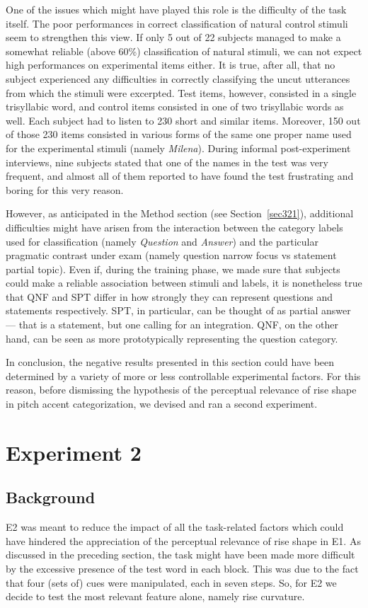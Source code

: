 One of the issues which might have played this role is the difficulty of the task itself. The poor performances in correct classification of natural control stimuli seem to strengthen this view. If only 5 out of 22 subjects managed to make a somewhat reliable (above 60\%) classification of natural stimuli, we can not expect high performances on experimental items either. It is true, after all, that no subject experienced any difficulties in correctly classifying the uncut utterances from which the stimuli were excerpted. Test items, however, consisted in a single trisyllabic word, and control items consisted in one of two trisyllabic words as well. Each subject had to listen to 230 short and similar items. Moreover, 150 out of those 230 items consisted in various forms of the same one proper name used for the experimental stimuli (namely \textit{Milena}). During informal post-experiment interviews, nine subjects stated that one of the names in the test was very frequent, and almost all of them reported to have found the test frustrating and boring for this very reason.

However, as anticipated in the Method section (see Section~\ref{sec321}), additional difficulties might have arisen from the interaction between the category labels used for classification (namely \textit{Question} and \textit{Answer}) and the particular pragmatic contrast under exam (namely question narrow focus vs statement partial topic). Even if, during the training phase, we made sure that subjects could make a reliable association between stimuli and labels, it is nonetheless true that QNF and SPT differ in how strongly they can represent questions and statements respectively. SPT, in particular, can be thought of as partial answer --- that is a statement, but one calling for an integration. QNF, on the other hand, can be seen as more prototypically representing the question category.

In conclusion, the negative results presented in this section could have been determined by a variety of more or less controllable experimental factors. For this reason, before dismissing the hypothesis of the perceptual relevance of rise shape in pitch accent categorization, we devised and ran a second experiment.

\section{Experiment 2}\label{sec33}
\subsection{Background}\label{sec3300}
E2 was meant to reduce the impact of all the task-related factors which could have hindered the appreciation of the perceptual relevance of rise shape in E1. As discussed in the preceding section, the task might have been made more difficult by the excessive presence of the test word in each block. This was due to the fact that four (sets of) cues were manipulated, each in seven steps. So, for E2 we decide to test the most relevant feature alone, namely rise curvature.

